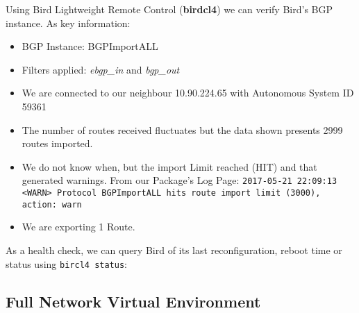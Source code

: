 

Using Bird Lightweight Remote Control (\textbf{birdcl4}) we can verify Bird's BGP instance. As key information:

\begin{itemize}
    \item BGP Instance: BGPImportALL
    \item Filters applied: \textit{ebgp\_in} and \textit{bgp\_out}
    \item We are connected to our neighbour 10.90.224.65 with Autonomous System ID 59361
    \item  The number of routes received fluctuates but the data shown presents 2999 routes imported.
    \item We do not know when, but the import Limit reached (HIT) and that generated warnings.
    From our Package's Log Page:
    \texttt{2017-05-21 22:09:13 <WARN> Protocol BGPImportALL hits route import limit (3000), action: warn}
    \item We are exporting 1 Route.
\end{itemize}

As a health check, we can query Bird of its last reconfiguration, reboot time or status using \texttt{bircl4 status}:



\subsection{Full Network Virtual Environment}
